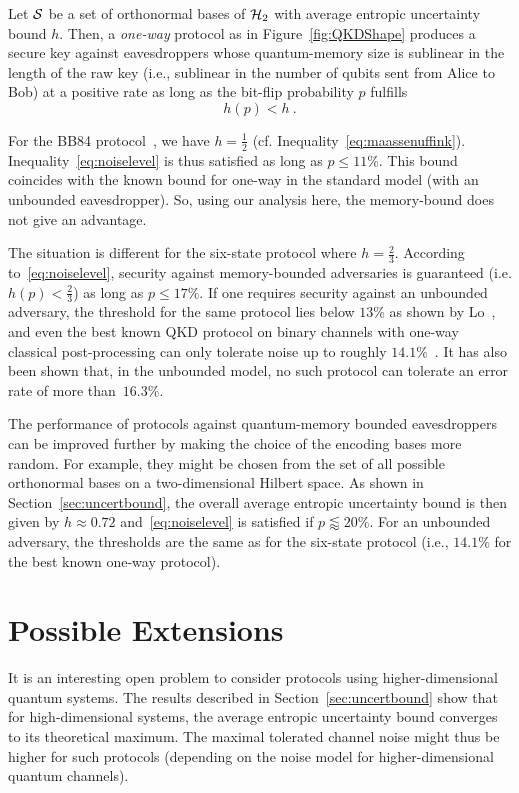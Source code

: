 \begin{theorem}
  Let $\mathcal{S}$ be a set of orthonormal bases of $\mathcal{H}_2$ with average
  entropic uncertainty bound $h$. Then, a \emph{one-way} \QKD protocol
  as in Figure~\ref{fig:QKDShape} produces a secure key against
  eavesdroppers whose quantum-memory size is sublinear in the length
  of the raw key (i.e., sublinear in the number of qubits sent from
  Alice to Bob) at a positive rate as long as the bit-flip probability
  $p$ fulfills
\begin{equation} \label{eq:noiselevel}
  h(p) < h \ .
\end{equation}
\end{theorem}

For the BB84 protocol~\cite{BB84}, we have $h = \frac{1}{2}$ (cf.
Inequality~\eqref{eq:maassenuffink}).  Inequality~\eqref{eq:noiselevel} is
thus satisfied as long as $p \leq 11\%$.  This bound coincides with
the known bound for one-way \QKD in the standard model (with an
unbounded eavesdropper). So, using our analysis here, the memory-bound
does not give an advantage.

The situation is different for the six-state protocol where $h =
\frac{2}{3}$. According to~\eqref{eq:noiselevel}, security against
memory-bounded adversaries is guaranteed (i.e. $h(p) < \frac{2}{3}$)
as long as $p \leq 17\%$. If one requires security against an
unbounded adversary, the threshold for the same protocol lies below
$13\%$ as shown by Lo~\cite{Lo01}, and even the best known QKD
protocol on binary channels with one-way classical post-processing can
only tolerate noise up to roughly $14.1\%$~\cite{RGK05}. It has also
been shown that, in the unbounded model, no such protocol can tolerate
an error rate of more than~$16.3\%$.

The performance of \QKD protocols against quantum-memory bounded
eavesdroppers can be improved further by making the choice of the
encoding bases more random. For example, they might be chosen from the
set of all possible orthonormal bases on a two-dimensional Hilbert
space.  As shown in Section~\ref{sec:uncertbound}, the overall average
entropic uncertainty bound is then given by $h \approx 0.72$
and~\eqref{eq:noiselevel} is satisfied if $p \lessapprox 20\%$.  For an
unbounded adversary, the thresholds are the same as for the six-state
protocol (i.e., $14.1\%$ for the best known one-way protocol).

\section{Possible Extensions}
It is an interesting open problem to consider protocols using
higher-dimensional quantum systems. The results described in
Section~\ref{sec:uncertbound} show that for high-dimensional systems,
the average entropic 
uncertainty bound converges to its theoretical maximum. The maximal
tolerated channel noise might thus be higher for such protocols
(depending on the noise model for higher-dimensional quantum
channels).

